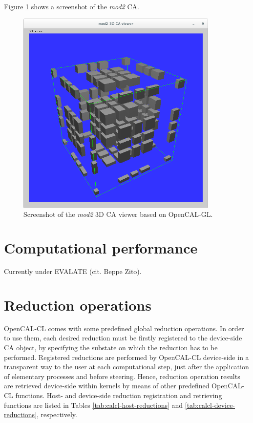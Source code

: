 Figure \ref{fig:calgl_mod2} shows a screenshot of the \emph{mod2} CA.

\begin{figure}
  \begin{center}
    \includegraphics[width=10cm]{./images/OpenCAL/calgl_mod2}
    \caption{Screenshot of the \emph{mod2} 3D CA viewer based on
      OpenCAL-GL.}
    \label{fig:calgl_mod2}
  \end{center}
\end{figure}


\section{Computational performance}
Currently under EVALATE (cit. Beppe Zito).


\section{Reduction operations}
OpenCAL-CL comes with some predefined global reduction operations. In
order to use them, each desired reduction must be firstly registered
to the device-side CA object, by specifying the substate on which the
reduction has to be performed. Registered reductions are performed by
OpenCAL-CL device-side in a transparent way to the user at each
computational step, just after the application of elementary processes
and before steering. Hence, reduction operation results are
retrieved device-side within kernels by means of other predefined
OpenCAL-CL functions. Host- and device-side reduction registration and
retrieving functions are listed in Tables
\ref{tab:calcl-host-reductions} and \ref{tab:calcl-device-reductions},
respectively.


